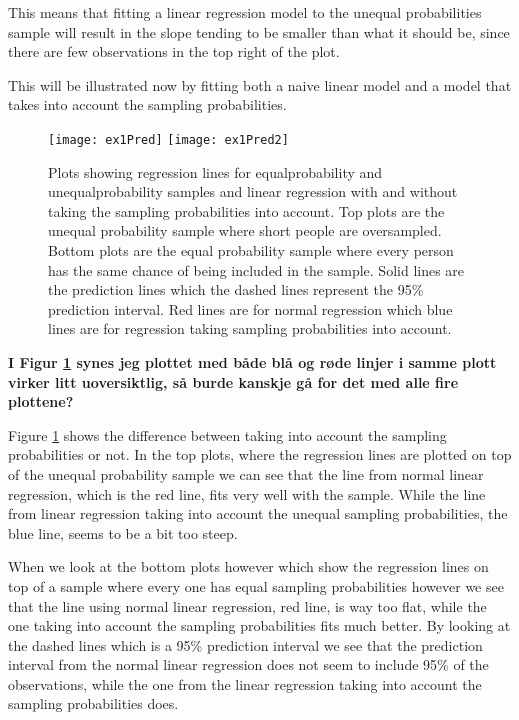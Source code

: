 \documentclass{article}
\begin{document}
\begin{example}
This means that fitting a linear regression model to the unequal probabilities
sample will result in the slope tending to be smaller than what it should be, since there are few observations in the top right of the plot.

This will be illustrated now by fitting both a naive linear model and a model that takes into account the sampling probabilities.


\begin{figure}
  \centering
  
  \texttt{[image: ex1Pred]}
  \texttt{[image: ex1Pred2]}
  \caption{Plots showing regression lines for equalprobability and
    unequalprobability samples and linear regression with and without taking the
    sampling probabilities into account. Top plots are the unequal probability
    sample where short people are oversampled. Bottom plots are the equal
    probability sample where every person has the same chance of being included
    in the sample. Solid lines are the prediction lines which the dashed lines
    represent the
    95\% prediction interval. Red lines are for normal regression which blue
       lines are for regression taking sampling probabilities into account.}
  \label{fig:ex1Pred}
\end{figure}

\textbf{I Figur \ref{fig:ex1Pred} synes jeg plottet med både blå og røde linjer i samme plott virker litt
  uoversiktlig, så burde kanskje gå for det med alle fire plottene?}

Figure \ref{fig:ex1Pred} shows the difference between taking into account the
sampling probabilities or not.
In the top plots, where the regression lines are plotted on top of the unequal
probability sample we can see that the line from normal linear regression, which
is the red line, fits very well with the sample. While the line from linear
regression taking into account the unequal sampling probabilities, the blue line, seems to be a
bit too steep.

When we look at the bottom plots however which show the regression lines on top
of a sample where every one has equal sampling probabilities however we see that
the line using normal linear regression, red line, is way too flat, while the
one taking into account the sampling probabilities fits much better.
By looking at the dashed lines which is a 95\% prediction interval we see that
the prediction interval from the normal linear regression does not seem to
include 95\% of the observations, while the one from the linear regression
taking into account the sampling probabilities does.
\end{example}
\end{document}
